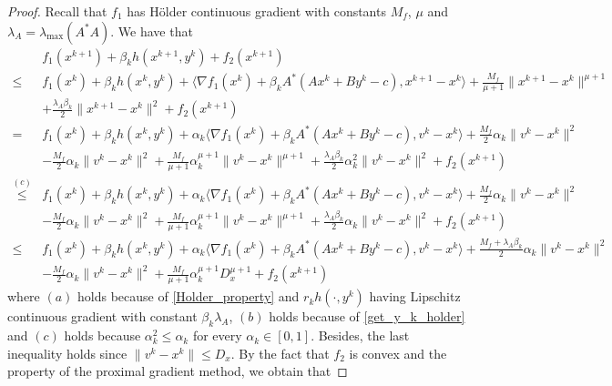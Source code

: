 \documentclass{article}
\numberwithin{equation}{section}
\begin{document}
\begin{proof}

    Recall that $f_1$ has H\"older continuous gradient with constants $M_f$, $\mu$ and $\lambda_{A} = \lambda_{\max}(A^*A)$. We have that
    \begin{align}
        &f_1(x^{k+1})+ \beta_{k}h(x^{k+1},y^k) +f_2(x^{k+1})  \nonumber \\
        \overset{\mathop{(a)}}{\leq}& f_1(x^k) +\beta_{k}h(x^k,y^k) +\langle \nabla f_1(x^k)+ \beta_{k}A^*(Ax^k+By^k-c), x^{k+1} -x^k\rangle + \frac{M_f}{\mu+1}\|x^{k+1} - x^{k}\rVert^{\mu+1} \nonumber \\
        &+\frac{\lambda_{A} \beta_k}{2}\|x^{k+1}-x^k\rVert^2 +f_2(x^{k+1})  \nonumber \\
        \overset{\mathop{(b)}}{=}& f_1(x^k) +\beta_kh(x^k,y^k) +\alpha_k\langle \nabla f_1(x^k)+\beta_{k}A^*(Ax^k+By^k-c), v^k -x^k\rangle +\frac{M_f}{2}\alpha_k\|v^k-x^k\rVert^2    \nonumber \\
        &-\frac{M_f}{2}\alpha_k\|v^k-x^k\rVert^2+\frac{M_f}{\mu+1}\alpha_k^{\mu +1}\|v^k - x^{k}\rVert^{\mu+1}+\frac{\lambda_{A} \beta_k} {2}\alpha_k^2 \|v^k-x^k\rVert^2+f_2(x^{k+1})  \nonumber \\
        \overset{(c)}{\leq} &f_1(x^k) +\beta_kh(x^k,y^k) +\alpha_k\langle \nabla f_1(x^k)+\beta_{k}A^*(Ax^k+By^k-c), v^k -x^k\rangle +\frac{M_f}{2}\alpha_k\|v^k-x^k\rVert^2    \nonumber \\
        &-\frac{M_f}{2}\alpha_k\|v^k-x^k\rVert^2+\frac{M_f}{\mu+1}\alpha_k^{\mu +1}\|v^k - x^{k}\rVert^{\mu+1}+\frac{\lambda_{A} \beta_k} {2}\alpha_k \|v^k-x^k\rVert^2+f_2(x^{k+1})  \nonumber \\
        \leq& f_1(x^k) +\beta_kh(x^k,y^k) +\alpha_k\langle \nabla f_1(x^k)+ \beta_{k}A^*(Ax^k+By^k-c), v^k -x^k\rangle +\frac{M_f +\lambda_{A} \beta_k}{2}\alpha_k\|v^k-x^k\rVert^2    \nonumber \\
        &-\frac{M_f}{2}\alpha_k\|v^k-x^k\rVert^2+\frac{M_f}{\mu+1}\alpha_k^{\mu +1}D_x^{\mu+1}+f_2(x^{k+1})  \label{f_1_poposition_1_holder}
    \end{align}
    where $(a)$ holds because of \eqref{Holder_property} and 
    $r_kh(\cdot,y^k)$ having Lipschitz continuous gradient with constant $\beta_k\lambda_{A}$, 
    $(b)$ holds because of \eqref{get_y_k_holder} and $(c)$ holds because $\alpha_k^2 \leq \alpha_k$ 
    for every $\alpha_k \in [0,1]$. Besides, the last inequality holds since $\|v^k-x^k\rVert \leq D_x$. 
    By the fact that $f_2$ is convex and the property of the proximal gradient method,  we obtain that

\end{proof}
\end{document}
